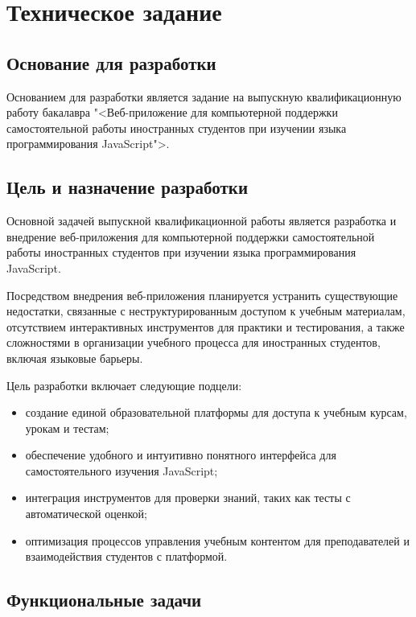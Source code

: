 \section{Техническое задание}
\subsection{Основание для разработки}

Основанием для разработки является задание на выпускную квалификационную работу бакалавра "<Веб-приложение для компьютерной поддержки самостоятельной работы  иностранных студентов при изучении языка программирования  JavaScript">.

\subsection{Цель и назначение разработки}

Основной задачей выпускной квалификационной работы является разработка и внедрение веб-приложения для компьютерной поддержки самостоятельной работы  иностранных студентов при изучении языка программирования  JavaScript.

Посредством внедрения веб-приложения планируется устранить существующие недостатки, связанные с неструктурированным доступом к учебным материалам, отсутствием интерактивных инструментов для практики и тестирования, а также сложностями в организации учебного процесса для иностранных студентов, включая языковые барьеры.

Цель разработки включает следующие подцели:

\begin{itemize}
\item создание единой образовательной платформы для доступа к учебным курсам, урокам и тестам;
\item обеспечение удобного и интуитивно понятного интерфейса для самостоятельного изучения JavaScript;
\item интеграция инструментов для проверки знаний, таких как тесты с автоматической оценкой;
\item оптимизация процессов управления учебным контентом для преподавателей и взаимодействия студентов с платформой.
\end{itemize}

\subsection{Функциональные задачи}

